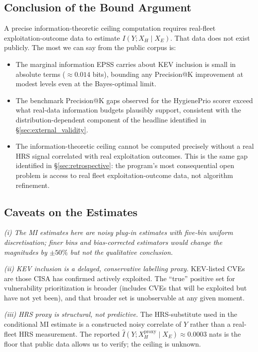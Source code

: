 \subsection{Conclusion of the Bound Argument}

A precise information-theoretic ceiling computation requires real-fleet
exploitation-outcome data to estimate $I(Y; X_H \mid X_E)$. That data
does not exist publicly. The most we can say from the public corpus
is:
\begin{itemize}
\item The marginal information EPSS carries about KEV inclusion is
small in absolute terms ($\approx 0.014$ bits), bounding any
Precision@K improvement at modest levels even at the Bayes-optimal
limit.
\item The benchmark Precision@K gaps observed for the HygienePrio scorer exceed what
real-data information budgets plausibly support, consistent with the
distribution-dependent component of the headline identified in
\S\ref{sec:external_validity}.
\item The information-theoretic ceiling cannot be computed precisely
without a real HRS signal correlated with real exploitation outcomes.
This is the same gap identified in \S\ref{sec:retrospective}: the
program's most consequential open problem is access to real fleet
exploitation-outcome data, not algorithm refinement.
\end{itemize}

\subsection{Caveats on the Estimates}

\textit{(i) The MI estimates here are noisy plug-in estimates with
five-bin uniform discretisation; finer bins and bias-corrected
estimators would change the magnitudes by $\pm 50\%$ but not the
qualitative conclusion.}

\textit{(ii) KEV inclusion is a delayed, conservative labelling proxy.}
KEV-listed CVEs are those CISA has confirmed actively exploited. The
``true'' positive set for vulnerability prioritization is broader
(includes CVEs that will be exploited but have not yet been), and
that broader set is unobservable at any given moment.

\textit{(iii) HRS proxy is structural, not predictive.}
The HRS-substitute used in the conditional MI estimate is a
constructed noisy correlate of $Y$ rather than a real-fleet HRS measurement.
The reported $\hat I(Y; X_H^{\text{proxy}} \mid X_E) \approx 0.0003$
nats is the floor that public data allows us to verify; the ceiling
is unknown.

